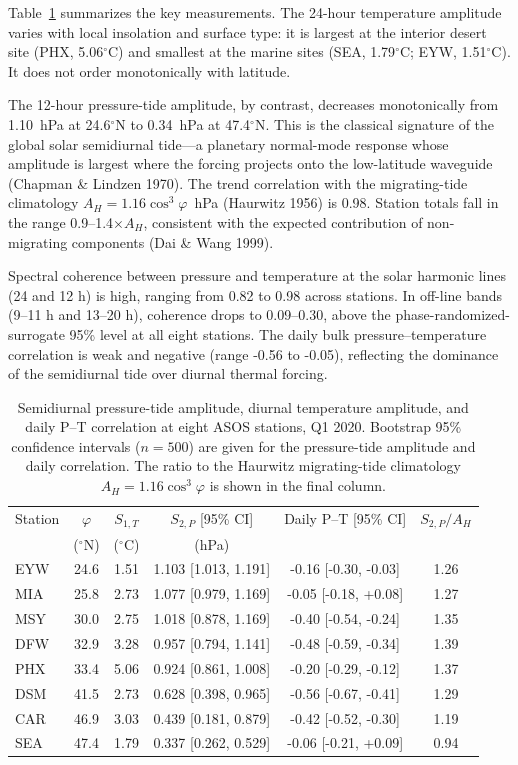 \documentclass[11pt]{article}
\begin{document}
Table~\ref{tab:asos} summarizes the key measurements. The 24-hour temperature amplitude varies with local insolation and surface type: it is largest at the interior desert site (PHX, 5.06$^\circ$C) and smallest at the marine sites (SEA, 1.79$^\circ$C; EYW, 1.51$^\circ$C). It does not order monotonically with latitude.

The 12-hour pressure-tide amplitude, by contrast, decreases monotonically from 1.10~hPa at 24.6$^\circ$N to 0.34~hPa at 47.4$^\circ$N. This is the classical signature of the global solar semidiurnal tide---a planetary normal-mode response whose amplitude is largest where the forcing projects onto the low-latitude waveguide (Chapman \& Lindzen 1970). The trend correlation with the migrating-tide climatology $A_H = 1.16\cos^3\varphi$~hPa (Haurwitz 1956) is 0.98. Station totals fall in the range 0.9--1.4$\times A_H$, consistent with the expected contribution of non-migrating components (Dai \& Wang 1999).

Spectral coherence between pressure and temperature at the solar harmonic lines (24 and 12 h) is high, ranging from 0.82 to 0.98 across stations. In off-line bands (9--11 h and 13--20 h), coherence drops to 0.09--0.30, above the phase-randomized-surrogate 95\% level at all eight stations. The daily bulk pressure--temperature correlation is weak and negative (range -0.56 to -0.05), reflecting the dominance of the semidiurnal tide over diurnal thermal forcing.

\begin{table}[t]
\centering
\caption{Semidiurnal pressure-tide amplitude, diurnal temperature amplitude, and daily P--T correlation at eight ASOS stations, Q1 2020. Bootstrap 95\% confidence intervals ($n=500$) are given for the pressure-tide amplitude and daily correlation. The ratio to the Haurwitz migrating-tide climatology $A_H = 1.16\cos^3\varphi$ is shown in the final column.}
\label{tab:asos}
\begin{tabular}{lccccc}
\toprule
Station & $\varphi$ & $S_{1,T}$ & $S_{2,P}$ [95\% CI] &
Daily P--T [95\% CI] & $S_{2,P}/A_H$ \\
 & ($^\circ$N) & ($^\circ$C) & (hPa) & & \\
\midrule
EYW & 24.6 & 1.51 & 1.103 [1.013, 1.191] & -0.16 [-0.30, -0.03] & 1.26 \\
MIA & 25.8 & 2.73 & 1.077 [0.979, 1.169] & -0.05 [-0.18, +0.08] & 1.27 \\
MSY & 30.0 & 2.75 & 1.018 [0.878, 1.169] & -0.40 [-0.54, -0.24] & 1.35 \\
DFW & 32.9 & 3.28 & 0.957 [0.794, 1.141] & -0.48 [-0.59, -0.34] & 1.39 \\
PHX & 33.4 & 5.06 & 0.924 [0.861, 1.008] & -0.20 [-0.29, -0.12] & 1.37 \\
DSM & 41.5 & 2.73 & 0.628 [0.398, 0.965] & -0.56 [-0.67, -0.41] & 1.29 \\
CAR & 46.9 & 3.03 & 0.439 [0.181, 0.879] & -0.42 [-0.52, -0.30] & 1.19 \\
SEA & 47.4 & 1.79 & 0.337 [0.262, 0.529] & -0.06 [-0.21, +0.09] & 0.94 \\
\bottomrule
\end{tabular}
\end{table}
\end{document}
